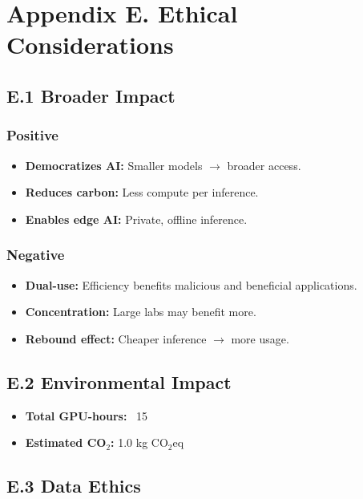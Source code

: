 
\section{Appendix E. Ethical Considerations}

\subsection{E.1 Broader Impact}

\subsubsection{Positive}
\begin{itemize}
\item \textbf{Democratizes AI:} Smaller models $\to$ broader access.
\item \textbf{Reduces carbon:} Less compute per inference.
\item \textbf{Enables edge AI:} Private, offline inference.

\end{itemize}
\subsubsection{Negative}
\begin{itemize}
\item \textbf{Dual-use:} Efficiency benefits malicious and beneficial applications.
\item \textbf{Concentration:} Large labs may benefit more.
\item \textbf{Rebound effect:} Cheaper inference $\to$ more usage.

\end{itemize}
\subsection{E.2 Environmental Impact}

\begin{itemize}
\item \textbf{Total GPU-hours:} ~15
\item \textbf{Estimated CO$_2$:} 1.0 kg CO$_2$eq

\end{itemize}
\subsection{E.3 Data Ethics}

